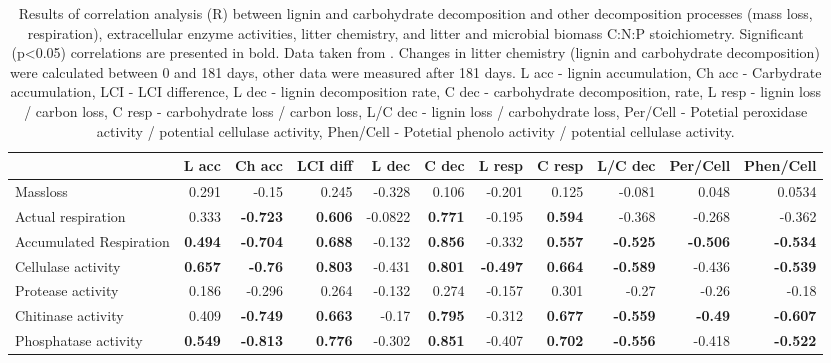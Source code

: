 \documentclass[10pt]{article}
\begin{document}
\begin{flushleft}
\begin{landscape}
\begin{table}[h!]
\begin{center}
\caption{Results of correlation analysis (R) between lignin and carbohydrate decomposition and other decomposition processes (mass loss, respiration), extracellular enzyme activities, litter chemistry, and litter and microbial biomass C:N:P stoichiometry. Significant (p\textless 0.05) correlations are presented in bold. Data taken from \cite{Mooshammer2011, Leitner2011}. Changes in litter chemistry (lignin and carbohydrate decomposition) were calculated between 0 and 181 days, other data were measured after 181 days. L acc - lignin accumulation, Ch acc - Carbydrate accumulation, LCI - LCI difference, L dec - lignin decomposition rate, C dec - carbohydrate decomposition,  rate, L resp - lignin loss / carbon loss, C resp - carbohydrate loss / carbon loss, L/C dec - lignin loss / carbohydrate loss, Per/Cell - Potetial peroxidase activity / potential cellulase activity, Phen/Cell - Potetial phenolo activity / potential cellulase activity.}
\label{corrtable}
{\small
\begin{tabular}{lrrrrrrrrrr}
  \hline
 & L acc & Ch acc & LCI diff & L dec & C dec & L resp & C resp & L/C dec & Per/Cell & Phen/Cell \\ 
  \hline
Massloss & 0.291 & -0.15 & 0.245 & -0.328 & 0.106 & -0.201 & 0.125 & -0.081 & 0.048 & 0.0534 \\ 
  Actual respiration & 0.333 & \textbf{-0.723} & \textbf{0.606} & -0.0822 & \textbf{0.771} & -0.195 & \textbf{0.594} & -0.368 & -0.268 & -0.362 \\ 
  Accumulated Respiration & \textbf{0.494} & \textbf{-0.704} & \textbf{0.688} & -0.132 & \textbf{0.856} & -0.332 & \textbf{0.557} & \textbf{-0.525} & \textbf{-0.506} & \textbf{-0.534} \\ 
  Cellulase activity & \textbf{0.657} & \textbf{-0.76} & \textbf{0.803} & -0.431 & \textbf{0.801} & \textbf{-0.497} & \textbf{0.664} & \textbf{-0.589} & -0.436 & \textbf{-0.539} \\ 
  Protease activity & 0.186 & -0.296 & 0.264 & -0.132 & 0.274 & -0.157 & 0.301 & -0.27 & -0.26 & -0.18 \\ 
  Chitinase activity & 0.409 & \textbf{-0.749} & \textbf{0.663} & -0.17 & \textbf{0.795} & -0.312 & \textbf{0.677} & \textbf{-0.559} & \textbf{-0.49} & \textbf{-0.607} \\ 
  Phosphatase activity & \textbf{0.549} & \textbf{-0.813} & \textbf{0.776} & -0.302 & \textbf{0.851} & -0.407 & \textbf{0.702} & \textbf{-0.556} & -0.418 & \textbf{-0.522} \\ 

\end{tabular}}
\end{center}
\end{table}
\end{landscape}
\end{flushleft}
\end{document}
